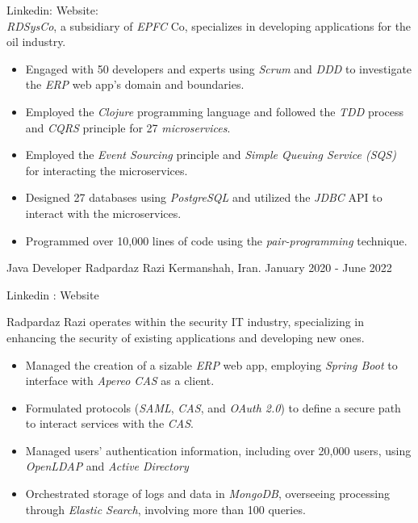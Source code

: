 \begin{experiences}
{
  Linkedin: 
  Website: \\
  \emph{RDSysCo}, a subsidiary of \emph{EPFC} Co, specializes in developing applications for the oil industry.
  \begin{itemize}
  \item Engaged with 50 developers and experts using \emph{Scrum} and \emph{DDD} to investigate the \textit{ERP} web app's domain and boundaries.
  \item Employed the \emph{Clojure} programming language and followed the \emph{TDD} process and \textit{CQRS} principle for 27 \emph{microservices}.
  \item Employed the \textit{Event Sourcing} principle and \textit{Simple Queuing Service (SQS)} for interacting the microservices.
  \item Designed 27 databases using \emph{PostgreSQL} and utilized the \emph{JDBC} API to interact with the microservices.
  \item Programmed over 10,000 lines of code using the \emph{pair-programming} technique.
  \end{itemize}}{}
 \emptySeparator
\experience
{}
{Java Developer}
{Radpardaz Razi}
{Kermanshah, Iran. \hspace{170 pt} January 2020 - June 2022}
{}
{
Linkedin : 
Website 
\par{Radpardaz Razi operates within the security IT industry, specializing in enhancing the security of existing applications and developing new ones.}
\begin{itemize}
\item Managed the creation of a sizable \emph{ERP} web app, employing \emph{Spring Boot} to interface with \emph{Apereo CAS} as a client.
\item Formulated protocols (\emph{SAML}, \emph{CAS}, and \emph{OAuth 2.0}) to define a secure path to interact services with the \textit{CAS}.
\item Managed users' authentication information, including over 20,000 users, using \emph{OpenLDAP} and \emph{Active Directory}
\item Orchestrated storage of logs and data in \emph{MongoDB}, overseeing processing through \emph{Elastic Search}, involving more than 100 queries.

\end{itemize}}
\end{experiences}

